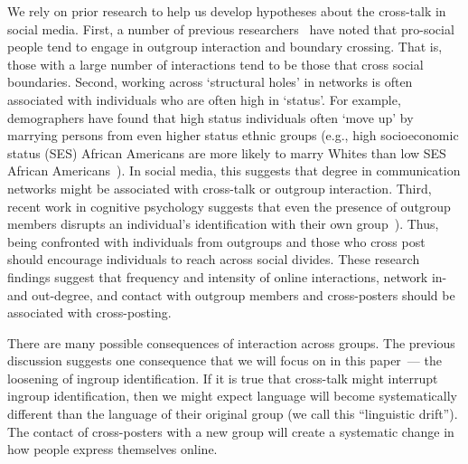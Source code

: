 \documentclass[letterpaper]{article}
\newcommand{\pat}[1]{{\textcolor{red}{Pat: #1}}}
\begin{document}
We rely on prior research to help us develop hypotheses about the cross-talk in social media. First, a number of previous researchers~\cite{bierhoff2002prosocial} have noted that pro-social people tend to engage in outgroup interaction and boundary crossing. That is, those with a large number of interactions tend to be those that cross social boundaries. Second, working across `structural holes' in networks is often associated with individuals who are often high in `status'. For example, demographers have found that high status individuals often `move up' by marrying persons from even higher status ethnic groups (e.g., high socioeconomic status (SES) African Americans are more likely to marry Whites than low SES African Americans~\cite{wimmer2013ethnic}). In social media, this suggests that degree in communication networks might be associated with cross-talk or outgroup interaction.  Third, recent work in cognitive psychology suggests that even the presence of outgroup members disrupts an individual's identification with their own group~\cite{hobson2016mere}). Thus, being confronted with individuals from outgroups and those who cross post should encourage individuals to reach across social divides. These research findings suggest that frequency and intensity of online interactions, network in- and out-degree, and contact with outgroup members and cross-posters should be associated with cross-posting. 

There are many possible consequences of interaction across groups. The previous discussion suggests one consequence that we will focus on in this paper~--- the loosening of ingroup identification. If it is true that cross-talk might interrupt ingroup identification, then we might expect language will become systematically different than the language of their original group (we call this ``linguistic drift''). The contact of cross-posters with a new group will create a systematic change in how people express themselves online.

\end{document}
